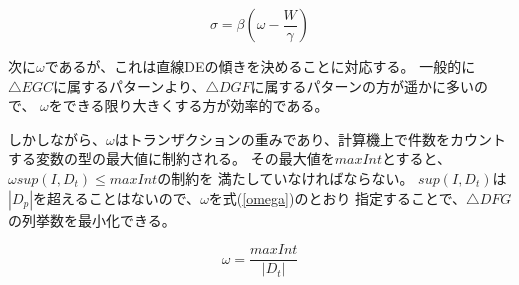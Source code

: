 \begin{equation}
\sigma=\beta (\omega-\frac{W}{\gamma})  \label{sigma_beta}
\end{equation}



次に$\omega$であるが、これは直線DEの傾きを決めることに対応する。
一般的に$\triangle{EGC}$に属するパターンより、$\triangle{DGF}$に属するパターンの方が遥かに多いので、
$\omega$をできる限り大きくする方が効率的である。

しかしながら、$\omega$はトランザクションの重みであり、計算機上で件数をカウント
する変数の型の最大値に制約される。
その最大値を$maxInt$とすると、$\omega sup(I,D_t)\le maxInt$の制約を
満たしていなければならない。
$sup(I,D_t)$は$|D_p|$を超えることはないので、$\omega$を式(\ref{omega})のとおり
指定することで、$\triangle{DFG}$の列挙数を最小化できる。

\begin{equation}
\omega=\frac{maxInt}{|D_t|} \label{omega}
\end{equation}


